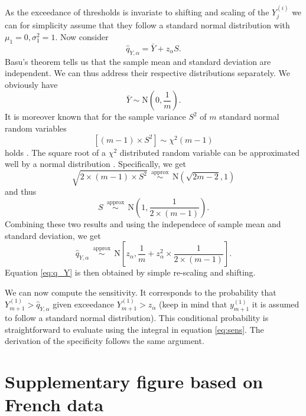 \documentclass{article}
\begin{document}
As the exceedance of thresholds is invariate to shifting and scaling of the $Y^{(i)}_j$ we can for simplicity assume that they follow a standard normal distribution with $\mu_1 = 0, \sigma^2_1 = 1$. Now consider
$$
\hat{q}_{Y, \alpha} = \bar{Y} + z_\alpha S.
$$
Basu's theorem tells us that the sample mean and standard deviation are independent. We can thus  address their respective distributions separately. We obviously have
$$
\bar{Y} \sim \text{N}\left(0, \frac{1}{m}\right).
$$
It is moreover known that for the sample variance $S^2$ of $m$ standard normal random variables
$$
[(m - 1) \times S^2] \sim \chi^2(m - 1)
$$
holds \citep{HELM2008}. The square root of a $\chi^2$ distributed random variable can be approximated well by a normal distribution \citep[p426]{Johnson1994}. Specifically, we get
$$
\sqrt{2 \times (m - 1) \times S^2} \ \  \stackrel{\text{approx}}{\sim} \ \ \text{N}(\sqrt{2m - 2}, 1)
$$
and thus
$$
S \ \  \stackrel{\text{approx}}{\sim} \ \ \text{N}\left(1, \frac{1}{2\times(m - 1)}\right).
$$
Combining these two results and using the independece of sample mean and standard deviation, we get
$$
\hat{q}_{Y, \alpha} \ \  \stackrel{\text{approx}}{\sim} \ \ \text{N}\left[z_\alpha, \frac{1}{m} + z_\alpha^2 \times \frac{1}{2 \times (m - 1)} \right].
$$
Equation \eqref{eq:q_Y} is then obtained by simple re-scaling and shifting.

We can now compute the sensitivity. It corresponds to the probability that $Y^{(1)}_{m + 1} > \hat{q}_{Y, \alpha}$ given exceedance $Y^{(1)}_{m + 1} > z_\alpha$ (keep in mind that $y^{(1)}_{m + 1}$ it is assumed to follow a standard normal distribution). This conditional probability is straightforward to evaluate using the integral in equation \eqref{eq:sens}. The derivation of the specificity follows the same argument.

\newpage

\section{Supplementary figure based on French data}
\end{document}
